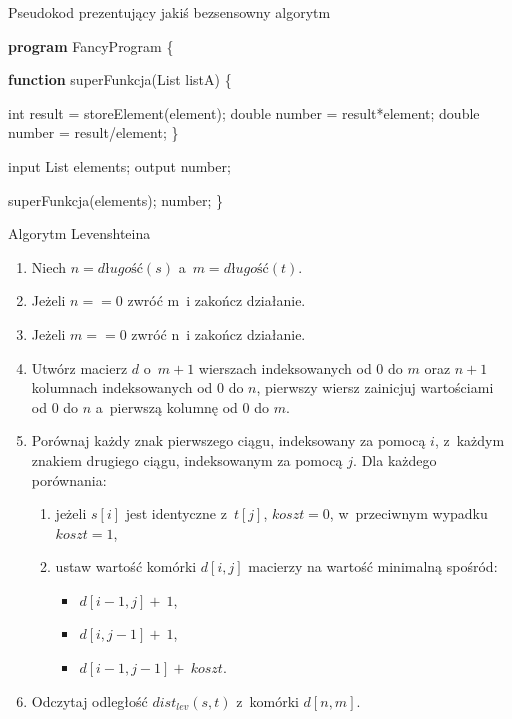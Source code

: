 \documentclass[twoside,a4paper,openright,12pt]{book}
\begin{document}
\begin{algorithm}
 \caption{Pseudokod prezentujący jakiś bezsensowny algorytm}
 \label{tboi:alg}
 \begin{algorithmic}[1]
\STATE \textbf{program} FancyProgram \{

\STATE \textbf{function} superFunkcja(List listA) \{

\STATE int result = storeElement(element);
\STATE double number = result*element;
\STATE double number = result/element;
\ENDIF
\ENDFOR
\STATE \}

\STATE input List elements;
\STATE output number;

\STATE superFunkcja(elements);
\RETURN number;
\STATE \}
 \end{algorithmic}
\end{algorithm}

\begin{algorithm}
 \caption{Algorytm Levenshteina}
 \label{tboi:alg_leven}
\begin{enumerate}
 \item Niech $n = \textit{długość}(s)$ a~$m = \textit{długość}(t)$.
 \item Jeżeli $n == 0$ zwróć m~i zakończ działanie.
 \item Jeżeli $m == 0$ zwróć n~i zakończ działanie.
 \item Utwórz macierz $d$ o~$m+1$ wierszach indeksowanych od $0$ do $m$ oraz $n+1$ kolumnach indeksowanych od $0$ do $n$, pierwszy wiersz zainicjuj wartościami od $0$ do $n$ a~pierwszą kolumnę od $0$ do $m$.
 \item Porównaj każdy znak pierwszego ciągu, indeksowany za pomocą $i$, z~każdym znakiem drugiego ciągu, indeksowanym za pomocą $j$. Dla każdego porównania:
\begin{enumerate}
 \item jeżeli $s[i]$ jest identyczne z~$t[j]$, $koszt = 0$, w~przeciwnym wypadku $koszt = 1$,
 \item ustaw wartość komórki $d[i,j]$ macierzy na wartość minimalną spośród:
\begin{itemize}
 \item $d[i-1,j] +~1$,
 \item $d[i,j-1] +~1$,
 \item $d[i-1,j-1] +~koszt$.
\end{itemize}
\end{enumerate}
 \item Odczytaj odległość $dist_{lev}(s,t)$ z~komórki $d[n,m]$.
\end{enumerate}
\end{algorithm}
\end{document}
